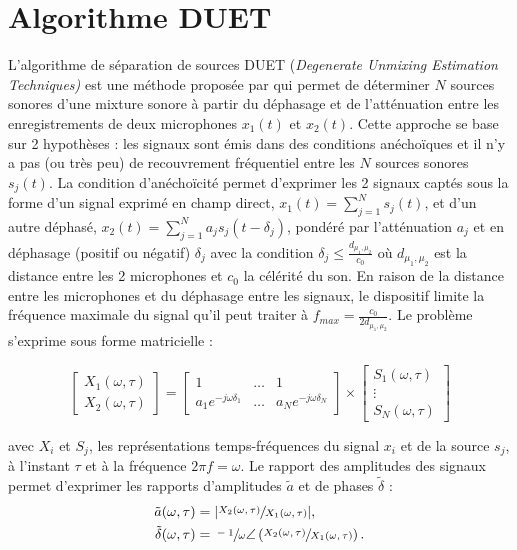 \section{Algorithme DUET}

L'algorithme de séparation de sources DUET (\textit{Degenerate Unmixing Estimation Techniques)} est une méthode proposée par \cite{rickard2007duet} qui permet de déterminer $N$ sources sonores d'une mixture sonore à partir du déphasage et de l'atténuation entre les enregistrements de deux microphones $x_1(t)$ et $x_2(t)$. Cette approche se base sur 2 hypothèses : les signaux sont émis dans des conditions anéchoïques et il n'y a pas (ou très peu) de recouvrement fréquentiel entre les $N$ sources sonores $s_j(t)$. La condition d'anéchoïcité permet d'exprimer les 2 signaux captés sous la forme d'un signal exprimé en champ direct, $x_1(t) = \sum_{j = 1}^{N}s_j(t)$, et d'un autre déphasé, $x_2(t) = \sum_{j = 1}^{N} a_j s_j(t-\delta_j)$, pondéré par l'atténuation $a_j$ et en déphasage (positif ou négatif) $\delta_j$ avec la condition $\delta_j \leqslant \frac{d_{\mu_1,\mu_2}}{c_0}$ où $d_{\mu_1,\mu_2}$ est la distance entre les 2 microphones et $c_0$ la célérité du son. En raison de la distance entre les microphones et du déphasage entre les signaux, le dispositif limite la fréquence maximale du signal qu'il peut traiter à $f_{max} = \frac{c_0}{2 d_{\mu_1,\mu_2}}$. Le problème s'exprime sous forme matricielle :

\begin{equation}\label{eq:algo-DUET}
\begin{bmatrix}
X_1(\omega,\tau) \\
X_2(\omega,\tau)
\end{bmatrix} =
\begin{bmatrix}
1 & \dots & 1 \\
a_1e^{-j\omega\delta_1} & \dots & a_Ne^{-j\omega\delta_N}
\end{bmatrix} \times
\begin{bmatrix}
S_1(\omega,\tau) \\
\vdots \\
S_N(\omega,\tau)
\end{bmatrix}
\end{equation}

avec $X_i$ et $S_j$, les représentations temps-fréquences du signal $x_i$ et de la source $s_j$, à l'instant $\tau$ et à la fréquence $2\pi f = \omega$.
Le rapport des amplitudes des signaux permet d'exprimer les rapports d'amplitudes $\tilde{a}$ et de phases $\tilde{\delta}$ :
\begin{subequations}
\begin{align}
\tilde{a}(\omega,\tau) &= \vert\sfrac{X_2(\omega,\tau)}{X_1(\omega,\tau)}\vert, \\
\tilde{\delta}(\omega,\tau) &= \sfrac{-1}{\omega}\angle\left(\sfrac{X_2(\omega,\tau)}{X_1(\omega,\tau)}\right).
\end{align}
\end{subequations}

